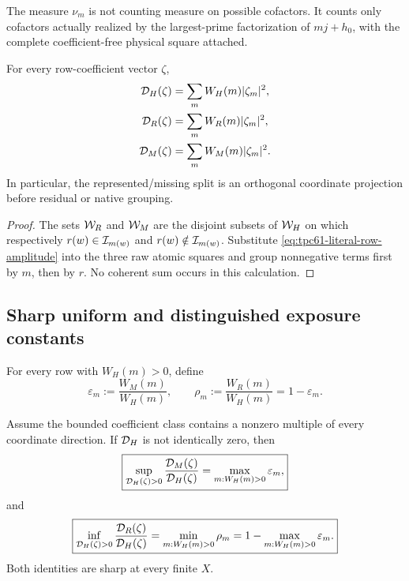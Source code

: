 The measure \(\nu_m\) is not counting measure on possible cofactors.  It
counts only cofactors actually realized by the largest-prime factorization
of \(mj+h_0\), with the complete coefficient-free physical square attached.

\begin{proposition}
\label{prop:tpc61-exact-row-disintegration}
For every row-coefficient vector \(\zeta\),
\begin{align}
 \mathcal D_H(\zeta)
 &=\sum_mW_H(m)|\zeta_m|^2,
 \label{eq:tpc61-DH-row-disintegration}\\
 \mathcal D_R(\zeta)
 &=\sum_mW_R(m)|\zeta_m|^2,
 \label{eq:tpc61-DR-row-disintegration}\\
 \mathcal D_M(\zeta)
 &=\sum_mW_M(m)|\zeta_m|^2.
 \label{eq:tpc61-DM-row-disintegration}
\end{align}
In particular, the represented/missing split is an orthogonal coordinate
projection before residual or native grouping.
\end{proposition}

\begin{proof}
The sets \(\mathcal W_R\) and \(\mathcal W_M\) are the disjoint subsets of
\(\mathcal W_H\) on which respectively \(r(w)\in\mathcal I_{m(w)}\) and
\(r(w)\notin\mathcal I_{m(w)}\).  Substitute
\eqref{eq:tpc61-literal-row-amplitude} into the three raw atomic
squares and group nonnegative terms first by \(m\), then by \(r\).
No coherent sum occurs in this calculation.
\end{proof}

\subsection{Sharp uniform and distinguished exposure constants}

For every row with \(W_H(m)>0\), define
\begin{equation}
 \varepsilon_m
 :=\frac{W_M(m)}{W_H(m)},
 \qquad
 \rho_m:=\frac{W_R(m)}{W_H(m)}=1-\varepsilon_m.
 \label{eq:tpc61-row-defect-and-exposure}
\end{equation}

\begin{theorem}
\label{thm:tpc61-rowwise-exposure-minimax}
Assume the bounded coefficient class contains a nonzero multiple of every
coordinate direction.  If \(\mathcal D_H\) is not identically zero, then
\begin{equation}
 \boxed{
 \sup_{\mathcal D_H(\zeta)>0}
 \frac{\mathcal D_M(\zeta)}{\mathcal D_H(\zeta)}
 =\max_{m:W_H(m)>0}\varepsilon_m,}
 \label{eq:tpc61-sharp-missing-minimax}
\end{equation}
and
\begin{equation}
 \boxed{
 \inf_{\mathcal D_H(\zeta)>0}
 \frac{\mathcal D_R(\zeta)}{\mathcal D_H(\zeta)}
 =\min_{m:W_H(m)>0}\rho_m
 =1-\max_{m:W_H(m)>0}\varepsilon_m.}
 \label{eq:tpc61-sharp-represented-minimax}
\end{equation}
Both identities are sharp at every finite \(X\).
\end{theorem}

